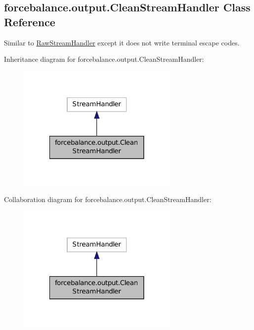 \hypertarget{classforcebalance_1_1output_1_1CleanStreamHandler}{\subsection{forcebalance.\-output.\-Clean\-Stream\-Handler Class Reference}
\label{classforcebalance_1_1output_1_1CleanStreamHandler}
}


Similar to \hyperlink{classforcebalance_1_1output_1_1RawStreamHandler}{Raw\-Stream\-Handler} except it does not write terminal escape codes.  




Inheritance diagram for forcebalance.\-output.\-Clean\-Stream\-Handler\-:
\nopagebreak
\begin{figure}[H]
\begin{center}
\leavevmode
\includegraphics[width=222pt]{classforcebalance_1_1output_1_1CleanStreamHandler__inherit__graph}
\end{center}
\end{figure}


Collaboration diagram for forcebalance.\-output.\-Clean\-Stream\-Handler\-:
\nopagebreak
\begin{figure}[H]
\begin{center}
\leavevmode
\includegraphics[width=222pt]{classforcebalance_1_1output_1_1CleanStreamHandler__coll__graph}
\end{center}
\end{figure}
